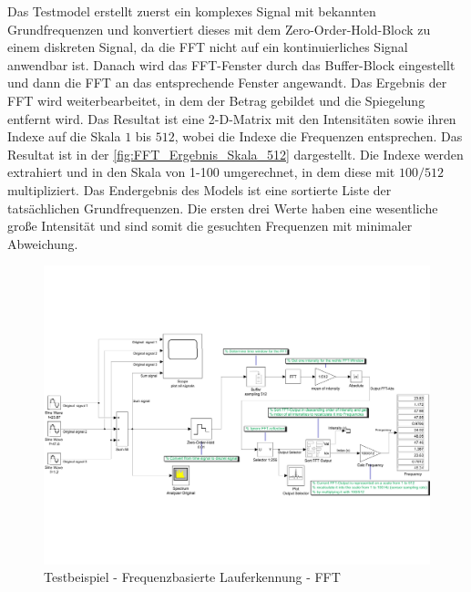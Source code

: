 Das Testmodel erstellt zuerst ein komplexes Signal mit bekannten Grundfrequenzen und konvertiert dieses mit dem \glqq Zero-Order-Hold\grqq{}-Block zu einem diskreten Signal, da die FFT nicht auf ein kontinuierliches Signal anwendbar ist. Danach wird das FFT-Fenster durch das \glqq Buffer\grqq{}-Block eingestellt und dann die FFT an das entsprechende Fenster angewandt. Das Ergebnis der FFT wird weiterbearbeitet, in dem der Betrag gebildet und die Spiegelung entfernt wird. Das Resultat ist eine 2-D-Matrix mit den Intensitäten sowie ihren Indexe auf die Skala $1$ bis $512$, wobei die Indexe die Frequenzen entsprechen. Das Resultat ist in der \autoref{fig:FFT_Ergebnis_Skala_512} dargestellt. Die Indexe werden extrahiert und in den Skala von 1-100 umgerechnet, in dem diese mit $100/512$ multipliziert.
Das Endergebnis des Models ist eine sortierte Liste der tatsächlichen Grundfrequenzen. Die ersten drei Werte haben eine wesentliche große Intensität und sind somit die gesuchten Frequenzen mit minimaler Abweichung.

\begin{landscape}
	\begin{figure}
		\centering
		\includegraphics[width=\linewidth]{Bilder/Lauferkennung_FFT_Testmodell1.pdf}
		\caption{Testbeispiel - Frequenzbasierte Lauferkennung - FFT}
		\label{fig:Lauferkennung_Freqbasiert_FFT_Testmodell}
	\end{figure}
\end{landscape}

